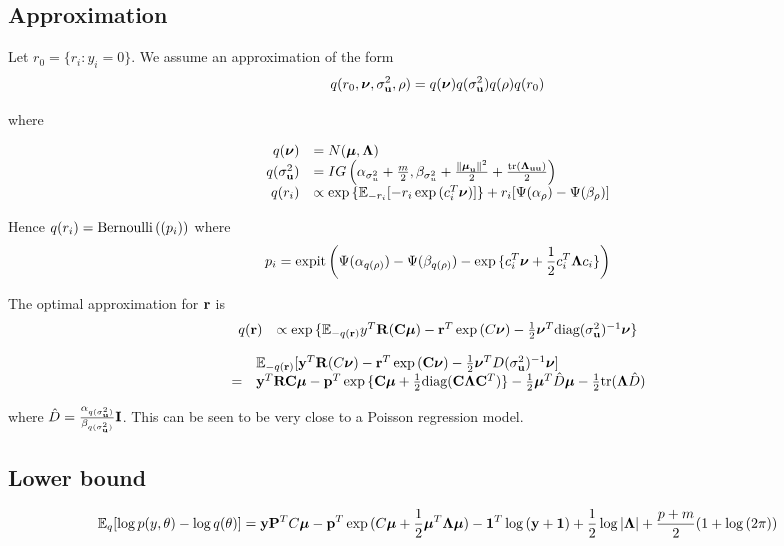 \documentclass{amsart}
\begin{document}
\subsection{Approximation}
Let $r_0 = \{ r_i : y_i = 0 \}$.
We assume an approximation of the form
$$
q(r_0, {\boldsymbol \nu}, \sigma_{{\bf u}}^2, \rho) = q({\boldsymbol \nu}) q(\sigma_{{\bf u}}^2) q(\rho) q(r_0) \\
$$

where

$$
\begin{array}{rl}
q({\boldsymbol \nu}) &= N({\boldsymbol \mu}, {\boldsymbol \Lambda}) \\
q(\sigma_{{\bf u}}^2) &= IG\left(\alpha_{\sigma_u^2} + \frac{m}{2}, \beta_{\sigma_u^2} + \frac{\|{\boldsymbol \mu}_{\bf u}\|^2}{2} + \frac{\text{tr}({\boldsymbol \Lambda}_{{\bf u}{\bf u}})}{2}\right) \\
q(r_i) &\propto \exp{\{{\mathbb E}_{-r_i} [-r_i \exp{(c_i^T{\boldsymbol\nu})}]\} + r_i [\Psi(\alpha_\rho) - \Psi(\beta_\rho)]} \\
\end{array}
$$

Hence $q(r_i) = {\text{Bernoulli} \left( (p_i) \right)}$ where
$$
p_i = {\text{expit} \left( \Psi{(\alpha_{q(\rho)})} - \Psi{(\beta_{q(\rho)})} - \exp{\{c_i^T{\boldsymbol\nu}+ {\frac{1}{2}}c_i^T {\boldsymbol\Lambda}c_i\}} \right)}
$$

The optimal approximation for ${\bf r}$ is
$$
\begin{array}{ll}
q({\bf r}) &\propto \exp{\{{\mathbb E}_{-q({\bf r})}y^T{\bf R}({\bf C}{\boldsymbol\mu}) - {\bf r}^T\exp{(C{\boldsymbol\nu})}-{\frac{1}{2}}{\boldsymbol\nu}^T \text{diag}(\sigma_{{\bf u}}^2)^{-1} {\boldsymbol\nu}\}}
\end{array}
$$

$$
\begin{array}{ll}
&{\mathbb E}_{-q({\bf r})} [{\bf y}^T{\bf R}(C{\boldsymbol \nu}) - {\bf r}^T\exp{({\bf C}{\boldsymbol\nu})}-{\frac{1}{2}} {\boldsymbol \nu}^T D(\sigma_{{\bf u}}^2)^{-1} {\boldsymbol \nu}]\\
=&{\bf y}^T{\bf R}{\bf C} {\boldsymbol \mu} - {\bf p}^T \exp{\{{\bf C}{\boldsymbol\mu}+ {\frac{1}{2}}\text{diag}({\bf C}{\boldsymbol\Lambda}{\bf C}^T)\}} - {\frac{1}{2}} {\boldsymbol \mu}^T \hat{D} {\boldsymbol \mu} - {\frac{1}{2}} \text{tr}({\boldsymbol \Lambda} \hat{D})
\end{array}
$$

where $\hat{D} = \frac{\alpha_{q(\sigma_{{\bf u}}^2)}}{\beta_{q(\sigma_{{\bf u}}^2)}} {\bf I}$. This can be seen to be very close to a Poisson
regression model.

\subsection{Lower bound}
$$
{\mathbb E}_q [\log{p(y, \theta)} - \log{q(\theta)}] = 
{\bf y} {\bf P}^T C {\boldsymbol \mu} - {\bf p}^T\exp{(C{\boldsymbol\mu}+ {\frac{1}{2}}{\boldsymbol\mu}^T {\boldsymbol\Lambda}{\boldsymbol\mu})} - {\bf 1}^T\log{({\bf y}+ {\bf1})} +
{\frac{1}{2}} \log{|{\boldsymbol\Lambda}|} + \frac{p + m}{2} (1 + \log{(2 \pi)})
$$
\end{document}
